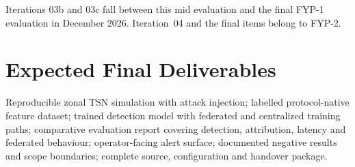 Iterations 03b and 03c fall between this mid evaluation and the final FYP-1
evaluation in December 2026. Iteration~04 and the final items belong to FYP-2.


\section{Expected Final Deliverables}
Reproducible zonal TSN simulation with attack injection; labelled protocol-native
feature dataset; trained detection model with federated and centralized training
paths; comparative evaluation report covering detection, attribution, latency and
federated behaviour; operator-facing alert surface; documented negative results and
scope boundaries; complete source, configuration and handover package.

